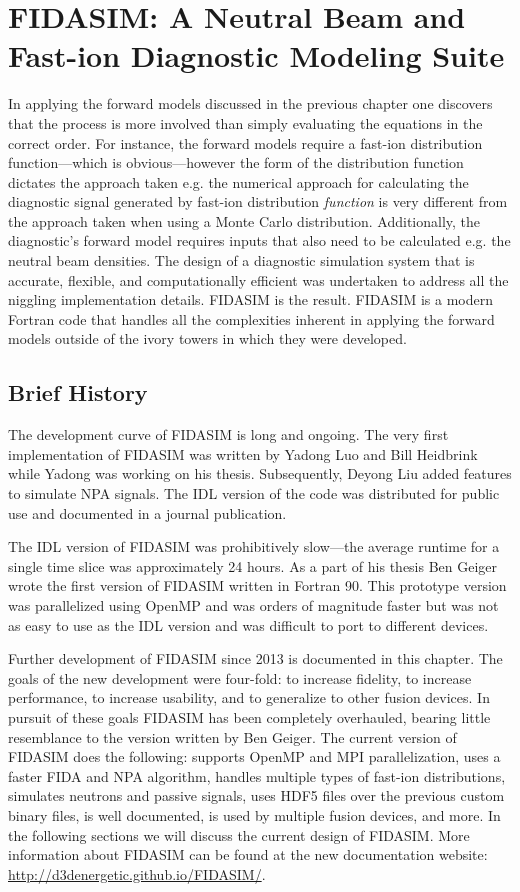 \chapter{FIDASIM: A Neutral Beam and Fast-ion Diagnostic Modeling Suite}\label{chap:fidasim}
In applying the forward models discussed in the previous chapter one discovers that the process is more involved than simply evaluating the equations in the correct order. For instance, the forward models require a fast-ion distribution function---which is obvious---however the form of the distribution function dictates the approach taken e.g. the numerical approach for calculating the diagnostic signal generated by fast-ion distribution \textit{function} is very different from the approach taken when using a Monte Carlo distribution. Additionally, the diagnostic's forward model requires inputs that also need to be calculated e.g. the neutral beam densities. The design of a diagnostic simulation system that is accurate, flexible, and computationally efficient was undertaken to address all the niggling implementation details. FIDASIM is the result. FIDASIM is a modern Fortran code that handles all the complexities inherent in applying the forward models outside of the ivory towers in which they were developed.  

\section{Brief History}
The development curve of FIDASIM is long and ongoing. 
The very first implementation of FIDASIM was written by Yadong Luo and Bill Heidbrink while Yadong was working on his thesis\cite{luo2007thesis}. Subsequently, Deyong Liu added features to simulate NPA signals. The IDL version of the code was distributed for public use and documented in a journal publication\cite{heidbrink2011code}.

The IDL version of FIDASIM was prohibitively slow---the average runtime for a single time slice was approximately 24 hours. As a part of his thesis\cite{geiger2013thesis} Ben Geiger wrote the first version of FIDASIM written in Fortran 90. This prototype version was parallelized using OpenMP and was orders of magnitude faster but was not as easy to use as the IDL version and was difficult to port to different devices.

Further development of FIDASIM since 2013 is documented in this chapter. The goals of the new development were four-fold: to increase fidelity, to increase performance, to increase usability, and to generalize to other fusion devices. In pursuit of these goals FIDASIM has been completely overhauled, bearing little resemblance to the version written by Ben Geiger. The current version of FIDASIM does the following: supports OpenMP and MPI parallelization, uses a faster FIDA and NPA algorithm, handles multiple types of fast-ion distributions, simulates neutrons and passive signals, uses HDF5 files over the previous custom binary files, is well documented, is used by multiple fusion devices, and more. In the following sections we will discuss the current design of FIDASIM. More information about FIDASIM can be found at the new documentation website: \url{http://d3denergetic.github.io/FIDASIM/}.

